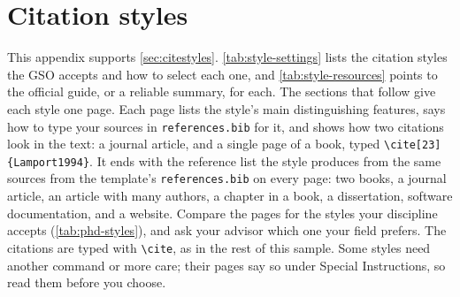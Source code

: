 %

\newcommand{\stylesample}[2]{%
  \IfFileExists{citation-styles/style-#2.pdf}
    {}
    {\section{#1}\label{sec:style-#2}%
     The sample page for this style is missing. Run \texttt{latexmk} in the
     \texttt{citation-styles} folder to build it.\clearpage}}

\chapter{Citation styles}
\label{app:citestyles}

This appendix supports \cref{sec:citestyles}. \cref{tab:style-settings} lists the citation styles the GSO accepts and how to select each one, and \cref{tab:style-resources} points to the official guide, or a reliable summary, for each. The sections that follow give each style one page. Each page lists the style's main distinguishing features, says how to type your sources in \texttt{references.bib} for it, and shows how two citations look in the text: a journal article, and a single page of a book, typed \verb+\cite[23]{Lamport1994}+. It ends with the reference list the style produces from the same sources from the template's \texttt{references.bib} on every page: two books, a journal article, an article with many authors, a chapter in a book, a dissertation, software documentation, and a website. Compare the pages for the styles your discipline accepts (\cref{tab:phd-styles}), and ask your advisor which one your field prefers. The citations are typed with \verb+\cite+, as in the rest of this sample. Some styles need another command or more care; their pages say so under Special Instructions, so read them before you choose.

